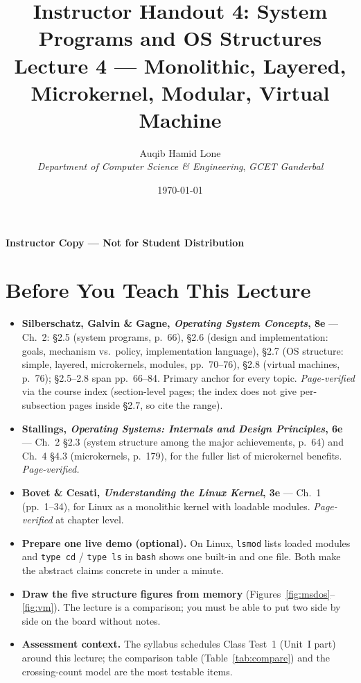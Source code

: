\documentclass[11pt]{article}
\title{Instructor Handout 4: System Programs and OS Structures\\[0.3em]
  \large Lecture 4 --- Monolithic, Layered, Microkernel, Modular, Virtual Machine}
\author{Auqib Hamid Lone\\[0.3em]
  \emph{Department of Computer Science \& Engineering}, \emph{GCET Ganderbal}}
\date{\today}
\begin{document}
\maketitle
{\centering\large\color{negative}\textbf{Instructor Copy --- Not for Student Distribution}\par}
\vspace{0.5cm}

\section{Before You Teach This Lecture}

\begin{itemize}
  \item \textbf{Silberschatz, Galvin \& Gagne, \textit{Operating System Concepts}, 8e} --- Ch.~2: \S2.5 (system programs, p.~66), \S2.6 (design and implementation: goals, mechanism vs.\ policy, implementation language), \S2.7 (OS structure: simple, layered, microkernels, modules, pp.~70--76), \S2.8 (virtual machines, p.~76); \S2.5--2.8 span pp.~66--84. Primary anchor for every topic. \emph{Page-verified} via the course index (section-level pages; the index does not give per-subsection pages inside \S2.7, so cite the range).
  \item \textbf{Stallings, \textit{Operating Systems: Internals and Design Principles}, 6e} --- Ch.~2 \S2.3 (system structure among the major achievements, p.~64) and Ch.~4 \S4.3 (microkernels, p.~179), for the fuller list of microkernel benefits. \emph{Page-verified.}
  \item \textbf{Bovet \& Cesati, \textit{Understanding the Linux Kernel}, 3e} --- Ch.~1 (pp.~1--34), for Linux as a monolithic kernel with loadable modules. \emph{Page-verified} at chapter level.
  \item \textbf{Prepare one live demo (optional).} On Linux, \texttt{lsmod} lists loaded modules and \texttt{type cd} / \texttt{type ls} in \texttt{bash} shows one built-in and one file. Both make the abstract claims concrete in under a minute.
  \item \textbf{Draw the five structure figures from memory} (Figures~\ref{fig:msdos}--\ref{fig:vm}). The lecture is a comparison; you must be able to put two side by side on the board without notes.
  \item \textbf{Assessment context.} The syllabus schedules Class Test~1 (Unit~I part) around this lecture; the comparison table (Table~\ref{tab:compare}) and the crossing-count model are the most testable items.
\end{itemize}
\end{document}
